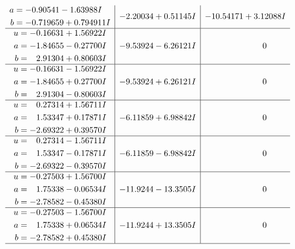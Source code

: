 \documentclass[1p]{elsarticle_modified}
\theoremstyle{definition}
\begin{document}
$$\begin{array}{c|c|c}
\begin{aligned}
a &= -0.90541 - 1.63988 I \\
b &= -0.719659 + 0.794911 I\end{aligned}
 & -2.20034 + 0.51145 I & -10.54171 + 3.12088 I \\ \hline\begin{aligned}
u &= -0.16631 + 1.56922 I \\
a &= -1.84655 - 0.27700 I \\
b &= \phantom{-}2.91304 + 0.80603 I\end{aligned}
 & -9.53924 - 6.26121 I & \phantom{-0.000000 } 0 \\ \hline\begin{aligned}
u &= -0.16631 - 1.56922 I \\
a &= -1.84655 + 0.27700 I \\
b &= \phantom{-}2.91304 - 0.80603 I\end{aligned}
 & -9.53924 + 6.26121 I & \phantom{-0.000000 } 0 \\ \hline\begin{aligned}
u &= \phantom{-}0.27314 + 1.56711 I \\
a &= \phantom{-}1.53347 + 0.17871 I \\
b &= -2.69322 + 0.39570 I\end{aligned}
 & -6.11859 + 6.98842 I & \phantom{-0.000000 } 0 \\ \hline\begin{aligned}
u &= \phantom{-}0.27314 - 1.56711 I \\
a &= \phantom{-}1.53347 - 0.17871 I \\
b &= -2.69322 - 0.39570 I\end{aligned}
 & -6.11859 - 6.98842 I & \phantom{-0.000000 } 0 \\ \hline\begin{aligned}
u &= -0.27503 + 1.56700 I \\
a &= \phantom{-}1.75338 - 0.06534 I \\
b &= -2.78582 - 0.45380 I\end{aligned}
 & -11.9244 - 13.3505 I & \phantom{-0.000000 } 0 \\ \hline\begin{aligned}
u &= -0.27503 - 1.56700 I \\
a &= \phantom{-}1.75338 + 0.06534 I \\
b &= -2.78582 + 0.45380 I\end{aligned}
 & -11.9244 + 13.3505 I & \phantom{-0.000000 } 0\\
 \hline 
 \end{array}$$\newpage$$\begin{array}{c|c|c}  

\end{array}$$
\end{document}
